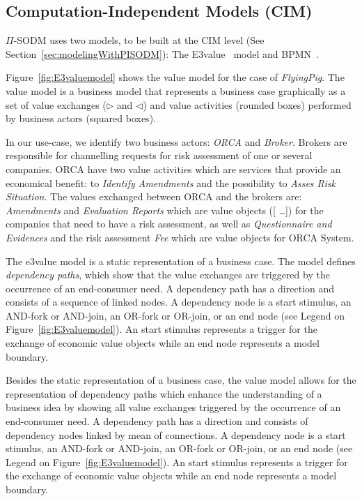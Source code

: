 \subsection{Computation-Independent Models (CIM)}

$\Pi$-SODM uses two models, to be built at the CIM level (See Section~\ref{sec:modelingWithPISODM}): The E3value~\cite{e3value} model and BPMN~\cite{BPMN}.

Figure~\ref{fig:E3valuemodel} shows the value model for the case of \textsl{FlyingPig}.
The value model is a business model that represents a business case graphically as a set of value exchanges ($\triangleright$ and $\triangleleft$) and value activities (rounded boxes) performed by business actors (squared boxes).

In our use-case, we identify two business actors: \textsl{ORCA} and \textsl{Broker}. 
Brokers are responsible for channelling requests for risk assessment of one or several companies. 
ORCA have two value activities which are services that provide an economical benefit: to \textsl{Identify Amendments} and the possibility to \textsl{Asses Risk Situation}. 
The values exchanged between ORCA and the brokers are: \textsl{Amendments} and \textsl{Evaluation Reports} which are value objects ([ \!\dots]) for the companies that need to have a risk assessment, as well as  \textsl{Questionnaire and Evidences} and the risk assessment \textsl{Fee} which are value objects for ORCA System.

The e3value model is a static representation of a business case.
The model defines \textit{dependency paths}, which show that the value exchanges are triggered by the occurrence of an end-consumer need. 
A dependency path has a direction and consists of a sequence of linked nodes. 
A dependency node is a start stimulus, an AND-fork or AND-join, an OR-fork or OR-join, or an end node (see Legend on Figure~\ref{fig:E3valuemodel}). An start stimulus represents a trigger for the exchange of economic value objects while an end node represents a model boundary.

Besides the static representation of a business case, the value model allows for the representation of dependency paths which enhance the understanding of a business idea by showing all value exchanges triggered by the occurrence of an end-consumer need. A dependency path has a direction and consists of dependency nodes linked by mean of connections. A dependency node is a start stimulus, an AND-fork or AND-join, an OR-fork or OR-join, or an end node (see Legend on Figure~\ref{fig:E3valuemodel}). An start stimulus represents a trigger for the exchange of economic value objects while an end node represents a model boundary.

